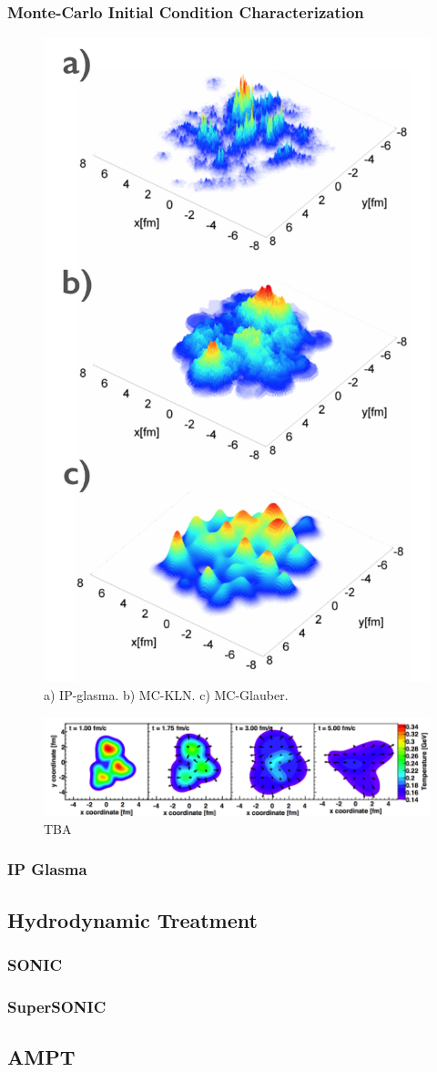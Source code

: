 \subsubsection{Monte-Carlo Initial Condition Characterization}
\begin{figure}[h!]
\begin{center}
\includegraphics[width=0.45\linewidth]{figs/initial_conditions.png}
\caption{ a) IP-glasma. b) MC-KLN. c) MC-Glauber.}
\end{center}
\end{figure}

\begin{figure}[h!]
\begin{center}
\includegraphics[width=0.45\linewidth]{figs/he3au_simulation.png}
\caption{ TBA }
\end{center}
\end{figure}

\subsubsection{IP Glasma}

\subsection{Hydrodynamic Treatment}

\subsubsection{SONIC}

\subsubsection{SuperSONIC}

\subsection{AMPT}